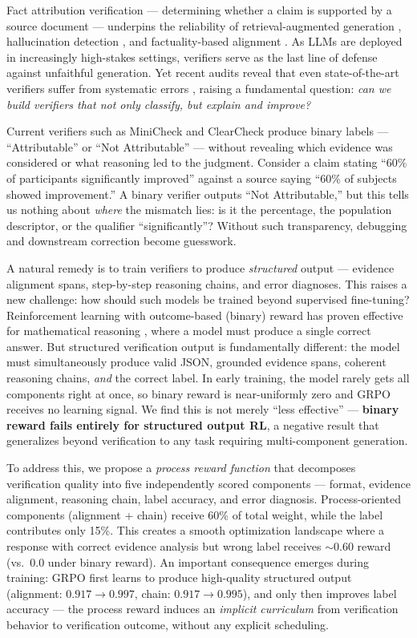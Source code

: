 \documentclass[11pt]{article}
\begin{document}
Fact attribution verification --- determining whether a claim is supported by a source document --- underpins the reliability of retrieval-augmented generation \citep{gao2023rarr}, hallucination detection \citep{min2023factscore}, and factuality-based alignment \citep{tian2024finetuning}.
As LLMs are deployed in increasingly high-stakes settings, verifiers serve as the last line of defense against unfaithful generation.
Yet recent audits reveal that even state-of-the-art verifiers suffer from systematic errors \citep{seo2025vtv}, raising a fundamental question: \emph{can we build verifiers that not only classify, but explain and improve?}

Current verifiers such as MiniCheck \citep{tang2024minicheck} and ClearCheck \citep{seo2025vtv} produce binary labels --- ``Attributable'' or ``Not Attributable'' --- without revealing which evidence was considered or what reasoning led to the judgment.
Consider a claim stating ``60\% of participants significantly improved'' against a source saying ``60\% of subjects showed improvement.''
A binary verifier outputs ``Not Attributable,'' but this tells us nothing about \emph{where} the mismatch lies: is it the percentage, the population descriptor, or the qualifier ``significantly''?
Without such transparency, debugging and downstream correction become guesswork.

A natural remedy is to train verifiers to produce \emph{structured} output --- evidence alignment spans, step-by-step reasoning chains, and error diagnoses.
This raises a new challenge: how should such models be trained beyond supervised fine-tuning?
Reinforcement learning with outcome-based (binary) reward has proven effective for mathematical reasoning \citep{shao2024deepseekmath, zha2025tango}, where a model must produce a single correct answer.
But structured verification output is fundamentally different: the model must simultaneously produce valid JSON, grounded evidence spans, coherent reasoning chains, \emph{and} the correct label.
In early training, the model rarely gets all components right at once, so binary reward is near-uniformly zero and GRPO receives no learning signal.
We find this is not merely ``less effective'' --- \textbf{binary reward fails entirely for structured output RL}, a negative result that generalizes beyond verification to any task requiring multi-component generation.

To address this, we propose a \emph{process reward function} that decomposes verification quality into five independently scored components --- format, evidence alignment, reasoning chain, label accuracy, and error diagnosis.
Process-oriented components (alignment + chain) receive 60\% of total weight, while the label contributes only 15\%.
This creates a smooth optimization landscape where a response with correct evidence analysis but wrong label receives ${\sim}0.60$ reward (vs.\ $0.0$ under binary reward).
An important consequence emerges during training: GRPO first learns to produce high-quality structured output (alignment: $0.917 \to 0.997$, chain: $0.917 \to 0.995$), and only then improves label accuracy --- the process reward induces an \emph{implicit curriculum} from verification behavior to verification outcome, without any explicit scheduling.
\end{document}
